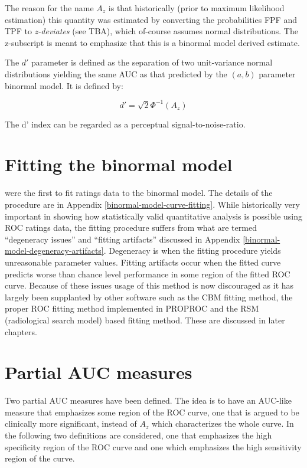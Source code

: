 \documentclass[
]{book}
\begin{document}
The reason for the name \(A_z\) is that historically (prior to maximum likelihood estimation) this quantity was estimated by converting the probabilities FPF and TPF to \emph{z-deviates} (see TBA), which of-course assumes normal distributions. The z-subscript is meant to emphasize that this is a binormal model derived estimate.

The \(d'\) parameter is defined as the separation of two unit-variance normal distributions yielding the same AUC as that predicted by the \((a,b)\) parameter binormal model. It is defined by:

\begin{equation} 
d'=\sqrt{2}\Phi^{-1}\left ( A_z \right )
\label{eq:binormal-model-ab-2dprime}
\end{equation}

The d' index can be regarded as a perceptual signal-to-noise-ratio.

\hypertarget{binormal-model-fitting}{%
\section{Fitting the binormal model}\label{binormal-model-fitting}}

\citep{dorfman1969maximum} were the first to fit ratings data to the binormal model. The details of the procedure are in Appendix \ref{binormal-model-curve-fitting}. While historically very important in showing how statistically valid quantitative analysis is possible using ROC ratings data, the fitting procedure suffers from what are termed ``degeneracy issues'' and ``fitting artifacts'' discussed in Appendix \ref{binormal-model-degeneracy-artifacts}. Degeneracy is when the fitting procedure yields unreasonable parameter values. Fitting artifacts occur when the fitted curve predicts worse than chance level performance in some region of the fitted ROC curve. Because of these issues usage of this method is now discouraged as it has largely been supplanted by other software such as the CBM fitting method, the proper ROC fitting method implemented in PROPROC and the RSM (radiological search model) based fitting method. These are discussed in later chapters.

\hypertarget{binormal-model-partial-auc}{%
\section{Partial AUC measures}\label{binormal-model-partial-auc}}

Two partial AUC measures have been defined. The idea is to have an AUC-like measure that emphasizes some region of the ROC curve, one that is argued to be clinically more significant, instead of \(A_z\) which characterizes the whole curve. In the following two definitions are considered, one that emphasizes the high specificity region of the ROC curve and one which emphasizes the high sensitivity region of the curve.
\end{document}
